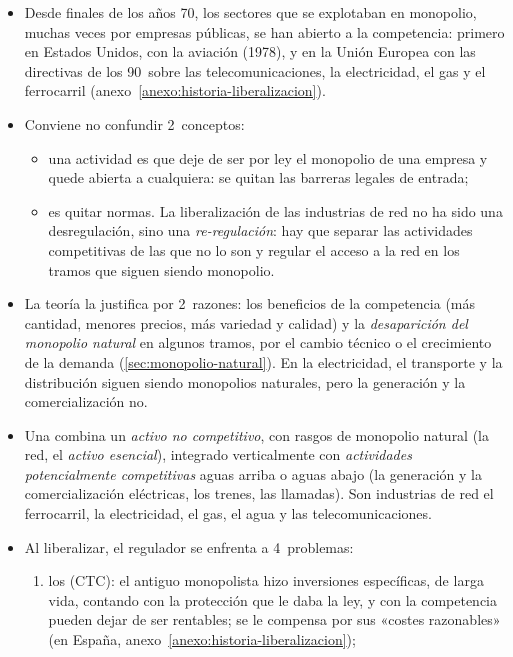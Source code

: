 \documentclass[11pt]{article}
\begin{document}
\begin{itemize}
\item Desde finales de los años 70, los sectores que se explotaban en monopolio, muchas veces por empresas públicas, se han abierto a la competencia: primero en Estados Unidos, con la aviación (1978), y en la Unión Europea con las directivas de los 90~sobre las telecomunicaciones, la electricidad, el gas y el ferrocarril (anexo~\ref{anexo:historia-liberalizacion}).
\item Conviene no confundir 2~conceptos:
  \begin{itemize}
  \item {} una actividad es que deje de ser por ley el monopolio de una empresa y quede abierta a cualquiera: se quitan las barreras legales de entrada;
  \item {} es quitar normas. La liberalización de las industrias de red no ha sido una desregulación, sino una \emph{re-regulación}: hay que separar las actividades competitivas de las que no lo son y regular el acceso a la red en los tramos que siguen siendo monopolio.
  \end{itemize}
\item La teoría la justifica por 2~razones: los beneficios de la competencia (más cantidad, menores precios, más variedad y calidad) y la \emph{desaparición del monopolio natural} en algunos tramos, por el cambio técnico o el crecimiento de la demanda (\ref{sec:monopolio-natural}). En la electricidad, el transporte y la distribución siguen siendo monopolios naturales, pero la generación y la comercialización no.
\item Una  combina un \emph{activo no competitivo}, con rasgos de monopolio natural (la red, el \emph{activo esencial}), integrado verticalmente con \emph{actividades potencialmente competitivas} aguas arriba o aguas abajo (la generación y la comercialización eléctricas, los trenes, las llamadas). Son industrias de red el ferrocarril, la electricidad, el gas, el agua y las telecomunicaciones.
\item Al liberalizar, el regulador se enfrenta a 4~problemas:
  \begin{enumerate}
  \item los  (CTC): el antiguo monopolista hizo inversiones específicas, de larga vida, contando con la protección que le daba la ley, y con la competencia pueden dejar de ser rentables; se le compensa por sus «costes razonables» (en España, anexo~\ref{anexo:historia-liberalizacion});

\end{enumerate}
\end{itemize}
\end{document}
